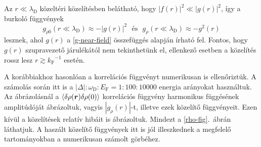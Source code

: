\documentclass[a4paper,12pt,titlepage]{article}
\newcommand{\RR}{{\vb*{r}}}
\newcommand{\kF}{{k_\text{F}}}
\newcommand{\EF}{{E_\text{F}}}
\begin{document}
Az $r \ll \lambda_\text{D}$ közeltéri közelítésben belátható, hogy $\left| f(r) \right|^2 \ll \left| g(r) \right|^2$, így a burkoló függvények
\begin{equation}
	g_{\rho 0}(r \ll \lambda_\text{D}) \approx -\left| g(r) \right|^2 ~~~ \text{és} ~~~ g_\rho(r \ll \lambda_\text{D}) \approx -g^2(r)
\end{equation}
lesznek, ahol $g(r)$ a \eqref{g-near-field} összefüggés alapján írható fel.  Fontos, hogy $g(r)$ szupravezető járulékától nem tekinthetünk el, ellenkező esetben a közelítés rossz lesz $r \gtrsim \kF^{-1}$ esetén.

A korábbiakhoz hasonlóan a korrelációs függvényt numerikusan is ellenőriztük.  A számolás során itt is a $\left| \Delta \right| : \omega_\text{D} : \EF = 1 : 100 : 10000$ energia arányokat használtuk.  Az ábrázolásnál a $\expval{\delta\rho(\RR) \delta\rho(0)}$ korrelációs függvény harmonikus függésének amplitúdóját ábrázoltuk, vagyis $\left| g_\rho(r) \right|$-t, illetve ezek közelítő függvényeit.  Ezen kívül a közelítések relatív hibáit is ábrázoltuk.  Mindezt a \ref{rho-fig}.\ ábrán láthatjuk.  A haszált közelítő függvények itt is jól illeszkednek a megfelelő tartományokban a numerikusan számolt görbéhez.
\end{document}
